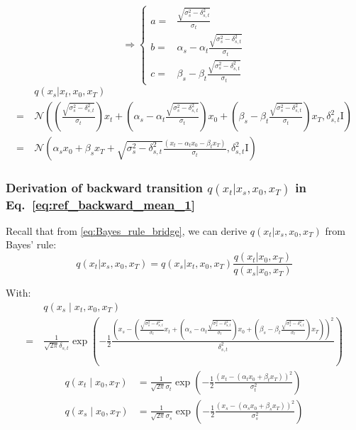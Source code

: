 \noindent 
\begin{equation}
\Rightarrow\begin{cases}
a= & \frac{\sqrt{\sigma_{s}^{2}-\delta_{s,t}^{2}}}{\sigma_{t}}\\
b= & \alpha_{s}-\alpha_{t}\frac{\sqrt{\sigma_{s}^{2}-\delta_{s,t}^{2}}}{\sigma_{t}}\\
c= & \beta_{s}-\beta_{t}\frac{\sqrt{\sigma_{s}^{2}-\delta_{s,t}^{2}}}{\sigma_{t}}
\end{cases}
\end{equation}
\begin{align}
 & q\left(x_{s}|x_{t},x_{0},x_{T}\right)\nonumber \\
=\  & \mathcal{N}\left(\left(\frac{\sqrt{\sigma_{s}^{2}-\delta_{s,t}^{2}}}{\sigma_{t}}\right)x_{t}+\left(\alpha_{s}-\alpha_{t}\frac{\sqrt{\sigma_{s}^{2}-\delta_{s,t}^{2}}}{\sigma_{t}}\right)x_{0}+\left(\beta_{s}-\beta_{t}\frac{\sqrt{\sigma_{s}^{2}-\delta_{s,t}^{2}}}{\sigma_{t}}\right)x_{T},\delta_{s,t}^{2}\mathrm{I}\right)\\
=\  & \mathcal{N}\left(\alpha_{s}x_{0}+\beta_{s}x_{T}+\sqrt{\sigma_{s}^{2}-\delta_{s,t}^{2}}\frac{\left(x_{t}-\alpha_{t}x_{0}-\beta_{t}x_{T}\right)}{\sigma_{t}},\delta_{s,t}^{2}\mathrm{I}\right)
\end{align}


\subsubsection{Derivation of backward transition $q\left(x_{t}|x_{s},x_{0},x_{T}\right)$
in Eq.~\ref{eq:ref_backward_mean_1}}

Recall that from \ref{eq:Bayes_rule_bridge}, we can derive $q\left(x_{t}|x_{s},x_{0},x_{T}\right)$
from Bayes' rule:
\begin{equation}
q\left(x_{t}|x_{s},x_{0},x_{T}\right)=q\left(x_{s}|x_{t},x_{0},x_{T}\right)\frac{q\left(x_{t}|x_{0},x_{T}\right)}{q\left(x_{s}|x_{0},x_{T}\right)}
\end{equation}

\noindent With: 
\begin{align}
 & q\left(x_{s}\mid x_{t},x_{0},x_{T}\right)\nonumber \\
=\  & \frac{1}{\sqrt{2\pi}\delta_{s,t}}\exp\left(-\frac{1}{2}\frac{\left(x_{s}-\left(\frac{\sqrt{\sigma_{s}^{2}-\delta_{s,t}^{2}}}{\sigma_{t}}x_{t}+\left(\alpha_{s}-\alpha_{t}\frac{\sqrt{\sigma_{s}^{2}-\delta_{s,t}^{2}}}{\sigma_{t}}\right)x_{0}+\left(\beta_{s}-\beta_{t}\frac{\sqrt{\sigma_{s}^{2}-\delta_{s,t}^{2}}}{\sigma_{t}}\right)x_{T}\right)\right)^{2}}{\delta_{s,t}^{2}}\right)
\end{align}
\begin{align}
q\left(x_{t}\mid x_{0},x_{T}\right) & =\frac{1}{\sqrt{2\pi}\sigma_{t}}\exp\left(-\frac{1}{2}\frac{\left(x_{t}-\left(\alpha_{t}x_{0}+\beta_{t}x_{T}\right)\right)^{2}}{\sigma_{t}^{2}}\right)\\
q\left(x_{s}\mid x_{0},x_{T}\right) & =\frac{1}{\sqrt{2\pi}\sigma_{s}}\exp\left(-\frac{1}{2}\frac{\left(x_{s}-\left(\alpha_{s}x_{0}+\beta_{s}x_{T}\right)\right)^{2}}{\sigma_{s}^{2}}\right)
\end{align}

